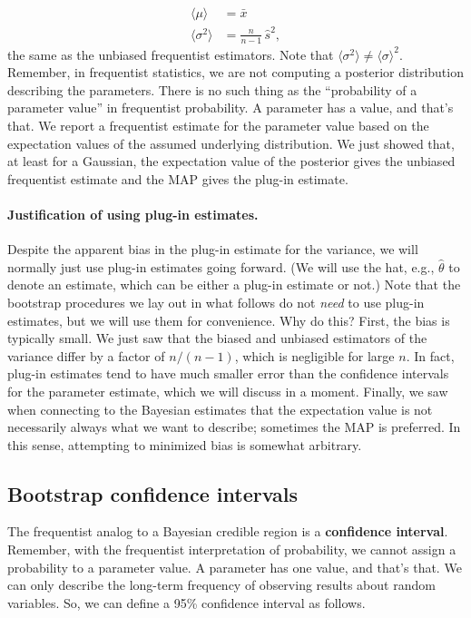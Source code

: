 \begin{align}
\langle \mu \rangle &= \bar{x} \\
\langle \sigma^2 \rangle &= \frac{n}{n-1}\,\hat{s}^2,
\end{align}
the same as the unbiased frequentist estimators.  Note that $\langle \sigma^2 \rangle \ne \langle \sigma \rangle ^2$.  Remember, in frequentist statistics, we are not computing a posterior distribution describing the parameters.  There is no such thing as the ``probability of a parameter value'' in frequentist probability.  A parameter has a value, and that's that.  We report a frequentist estimate for the parameter value based on the expectation values of the assumed underlying distribution. We just showed that, at least for a Gaussian, the expectation value of the posterior gives the unbiased frequentist estimate and the MAP gives the plug-in estimate.

\paragraph{Justification of using plug-in estimates.} Despite the apparent bias in the plug-in estimate for the variance, we will normally just use plug-in estimates going forward. (We will use the hat, e.g., $\hat{\theta}$ to denote an estimate, which can be either a plug-in estimate or not.) Note that the bootstrap procedures we lay out in what follows do not \textit{need} to use plug-in estimates, but we will use them for convenience. Why do this? First, the bias is typically small. We just saw that the biased and unbiased estimators of the variance differ by a factor of $n/(n-1)$, which is negligible for large $n$. In fact, plug-in estimates tend to have much smaller error than the confidence intervals for the parameter estimate, which we will discuss in a moment. Finally, we saw when connecting to the Bayesian estimates that the expectation value is not necessarily always what we want to describe; sometimes the MAP is preferred. In this sense, attempting to minimized bias is somewhat arbitrary.

\subsection{Bootstrap confidence intervals}
The frequentist analog to a Bayesian credible region is a \textbf{confidence interval}. Remember, with the frequentist interpretation of probability, we cannot assign a probability to a parameter value. A parameter has one value, and that's that. We can only describe the long-term frequency of observing results about random variables. So, we can define a 95\% confidence interval as follows.

